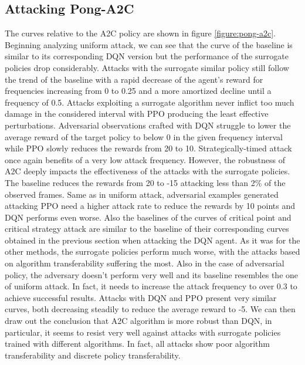 \subsection{Attacking Pong-A2C}
The curves relative to the A2C policy are shown in figure \ref{figure:pong-a2c}. Beginning analyzing uniform attack, we can see that the curve of the baseline is similar to its corresponding DQN version but the performance of the surrogate policies drop considerably. Attacks with the surrogate similar policy still follow the trend of the baseline with a rapid decrease of the agent's reward for frequencies increasing from 0 to 0.25 and a more amortized decline until a frequency of 0.5. Attacks exploiting a surrogate algorithm never inflict too much damage in the considered interval with PPO producing the least effective perturbations. Adversarial observations crafted with DQN struggle to lower the average reward of the target policy to below 0 in the given frequency interval while PPO slowly reduces the rewards from 20 to 10. Strategically-timed attack once again benefits of a very low attack frequency. However, the robustness of A2C deeply impacts the effectiveness of the attacks with the surrogate policies. The baseline reduces the rewards from 20 to -15 attacking less than 2\% of the observed frames. Same as in uniform attack, adversarial examples generated attacking PPO need a higher attack rate to reduce the rewards by 10 points and DQN performs even worse. Also the baselines of the curves of critical point and critical strategy attack are similar to the baseline of their corresponding curves obtained in the previous section when attacking the DQN agent. As it was for the other methods, the surrogate policies perform much worse, with the attacks based on algorithm transferability suffering the most. Also in the case of adversarial policy, the adversary doesn't perform very well and its baseline resembles the one of uniform attack. In fact, it needs to increase the attack frequency to over 0.3 to achieve successful results. Attacks with DQN and PPO present very similar curves, both decreasing steadily to reduce the average reward to -5. We can then draw out the conclusion that A2C algorithm is more robust than DQN, in particular, it seems to resist very well against attacks with surrogate policies trained with different algorithms. In fact, all attacks show poor algorithm transferability and discrete policy transferability.

